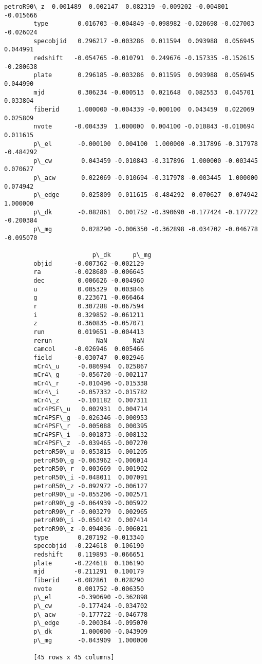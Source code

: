 \documentclass[11pt]{article}
\begin{document}
\begin{Verbatim}[commandchars=\\\{\}]
        petroR90\_z  0.001489  0.002147  0.082319 -0.009202 -0.004801 -0.015666   
        type        0.016703 -0.004849 -0.098982 -0.020698 -0.027003 -0.026024   
        specobjid   0.296217 -0.003286  0.011594  0.093988  0.056945  0.044991   
        redshift   -0.054765 -0.010791  0.249676 -0.157335 -0.152615 -0.280638   
        plate       0.296185 -0.003286  0.011595  0.093988  0.056945  0.044990   
        mjd         0.306234 -0.000513  0.021648  0.082553  0.045701  0.033804   
        fiberid     1.000000 -0.004339 -0.000100  0.043459  0.022069  0.025809   
        nvote      -0.004339  1.000000  0.004100 -0.010843 -0.010694  0.011615   
        p\_el       -0.000100  0.004100  1.000000 -0.317896 -0.317978 -0.484292   
        p\_cw        0.043459 -0.010843 -0.317896  1.000000 -0.003445  0.070627   
        p\_acw       0.022069 -0.010694 -0.317978 -0.003445  1.000000  0.074942   
        p\_edge      0.025809  0.011615 -0.484292  0.070627  0.074942  1.000000   
        p\_dk       -0.082861  0.001752 -0.390690 -0.177424 -0.177722 -0.200384   
        p\_mg        0.028290 -0.006350 -0.362898 -0.034702 -0.046778 -0.095070   
        
                        p\_dk      p\_mg  
        objid      -0.007362 -0.002129  
        ra         -0.028680 -0.006645  
        dec         0.006626 -0.004960  
        u           0.005329  0.003846  
        g           0.223671 -0.066464  
        r           0.307288 -0.067594  
        i           0.329852 -0.061211  
        z           0.360835 -0.057071  
        run         0.019651 -0.004413  
        rerun            NaN       NaN  
        camcol     -0.026946  0.005466  
        field      -0.030747  0.002946  
        mCr4\_u     -0.086994  0.025867  
        mCr4\_g     -0.056720 -0.002117  
        mCr4\_r     -0.010496 -0.015338  
        mCr4\_i     -0.057332 -0.015782  
        mCr4\_z     -0.101182  0.007311  
        mCr4PSF\_u   0.002931  0.004714  
        mCr4PSF\_g  -0.026346 -0.000953  
        mCr4PSF\_r  -0.005088  0.000395  
        mCr4PSF\_i  -0.001873 -0.008132  
        mCr4PSF\_z  -0.039465 -0.007270  
        petroR50\_u -0.053815 -0.001205  
        petroR50\_g -0.063962 -0.006014  
        petroR50\_r  0.003669  0.001902  
        petroR50\_i -0.048011  0.007091  
        petroR50\_z -0.092972 -0.006127  
        petroR90\_u -0.055206 -0.002571  
        petroR90\_g -0.064939 -0.005922  
        petroR90\_r -0.003279  0.002965  
        petroR90\_i -0.050142  0.007414  
        petroR90\_z -0.094036 -0.006021  
        type        0.207192 -0.013340  
        specobjid  -0.224618  0.106190  
        redshift    0.119893 -0.066651  
        plate      -0.224618  0.106190  
        mjd        -0.211291  0.100179  
        fiberid    -0.082861  0.028290  
        nvote       0.001752 -0.006350  
        p\_el       -0.390690 -0.362898  
        p\_cw       -0.177424 -0.034702  
        p\_acw      -0.177722 -0.046778  
        p\_edge     -0.200384 -0.095070  
        p\_dk        1.000000 -0.043909  
        p\_mg       -0.043909  1.000000  
        
        [45 rows x 45 columns]
\end{Verbatim}
            
\end{document}
